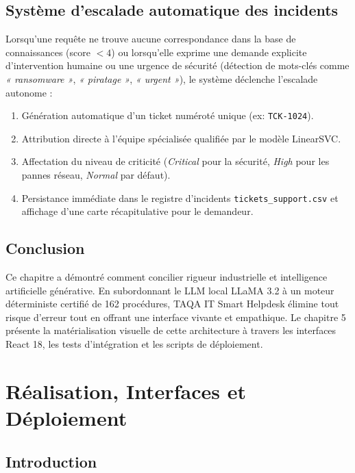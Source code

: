 \documentclass[12pt, a4paper, oneside]{report}
\begin{document}
\section{Système d'escalade automatique des incidents}

Lorsqu'une requête ne trouve aucune correspondance dans la base de connaissances (score $< 4$) ou lorsqu'elle exprime une demande explicite d'intervention humaine ou une urgence de sécurité (détection de mots-clés comme \textit{« ransomware »}, \textit{« piratage »}, \textit{« urgent »}), le système déclenche l'escalade autonome :
\begin{enumerate}
  \item Génération automatique d'un ticket numéroté unique (ex: \texttt{TCK-1024}).
  \item Attribution directe à l'équipe spécialisée qualifiée par le modèle LinearSVC.
  \item Affectation du niveau de criticité (\textit{Critical} pour la sécurité, \textit{High} pour les pannes réseau, \textit{Normal} par défaut).
  \item Persistance immédiate dans le registre d'incidents \texttt{tickets\_support.csv} et affichage d'une carte récapitulative pour le demandeur.
\end{enumerate}

\section{Conclusion}

Ce chapitre a démontré comment concilier rigueur industrielle et intelligence artificielle générative. En subordonnant le LLM local LLaMA 3.2 à un moteur déterministe certifié de 162 procédures, TAQA IT Smart Helpdesk élimine tout risque d'erreur tout en offrant une interface vivante et empathique. Le chapitre 5 présente la matérialisation visuelle de cette architecture à travers les interfaces React 18, les tests d'intégration et les scripts de déploiement.

\newpage
\chapter{Réalisation, Interfaces et Déploiement}

\section{Introduction}
\end{document}
